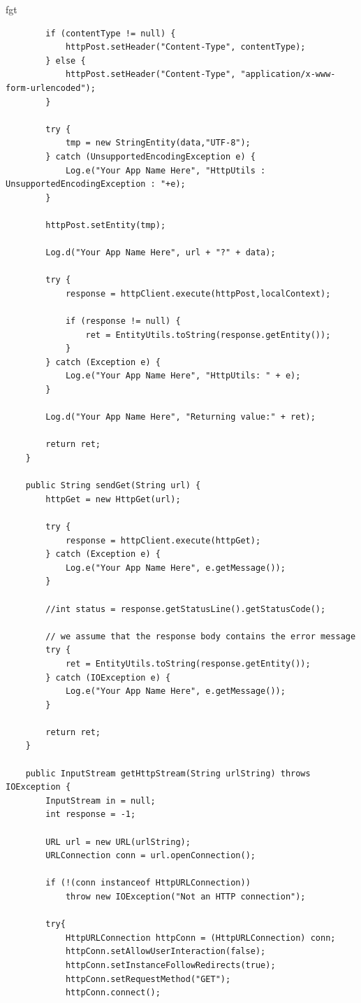 fgt\documentclass[12pt, %
openright, 
oneside, %
a4paper,    %
brazil]{facom-ufu-abntex2}
\begin{document}
\begin{anexosenv}
\begin{lstlisting}
        if (contentType != null) {
            httpPost.setHeader("Content-Type", contentType);
        } else {
            httpPost.setHeader("Content-Type", "application/x-www-form-urlencoded");
        }

        try {
            tmp = new StringEntity(data,"UTF-8");
        } catch (UnsupportedEncodingException e) {
            Log.e("Your App Name Here", "HttpUtils : UnsupportedEncodingException : "+e);
        }

        httpPost.setEntity(tmp);

        Log.d("Your App Name Here", url + "?" + data);

        try {
            response = httpClient.execute(httpPost,localContext);

            if (response != null) {
                ret = EntityUtils.toString(response.getEntity());
            }
        } catch (Exception e) {
            Log.e("Your App Name Here", "HttpUtils: " + e);
        }

        Log.d("Your App Name Here", "Returning value:" + ret);

        return ret;
    }

    public String sendGet(String url) {
        httpGet = new HttpGet(url);  

        try {
            response = httpClient.execute(httpGet);  
        } catch (Exception e) {
            Log.e("Your App Name Here", e.getMessage());
        }

        //int status = response.getStatusLine().getStatusCode();  

        // we assume that the response body contains the error message  
        try {
            ret = EntityUtils.toString(response.getEntity());  
        } catch (IOException e) {
            Log.e("Your App Name Here", e.getMessage());
        }

        return ret;
    }

    public InputStream getHttpStream(String urlString) throws IOException {
        InputStream in = null;
        int response = -1;

        URL url = new URL(urlString); 
        URLConnection conn = url.openConnection();

        if (!(conn instanceof HttpURLConnection))                     
            throw new IOException("Not an HTTP connection");

        try{
            HttpURLConnection httpConn = (HttpURLConnection) conn;
            httpConn.setAllowUserInteraction(false);
            httpConn.setInstanceFollowRedirects(true);
            httpConn.setRequestMethod("GET");
            httpConn.connect(); 


\end{lstlisting}
\end{anexosenv}
\end{document}
